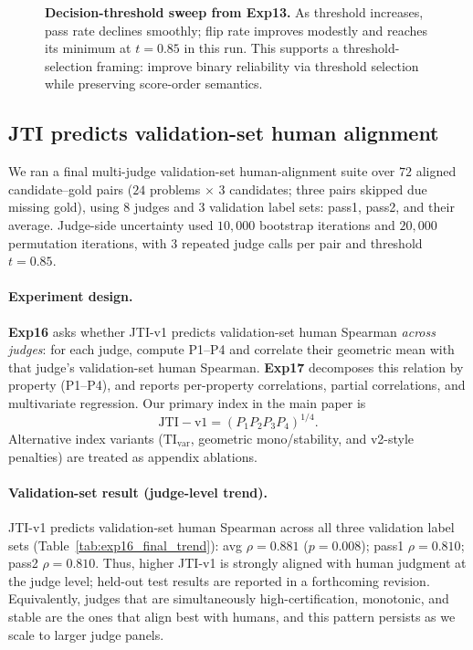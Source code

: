 \documentclass{article}
\begin{document}
\begin{figure}[t]
  \centering
  \resizebox{\linewidth}{!}{}
  \caption{\textbf{Decision-threshold sweep from Exp13.}
    As threshold increases, pass rate declines smoothly; flip rate improves modestly and reaches its minimum at \(t=0.85\) in this run.
    This supports a threshold-selection framing: improve binary reliability via threshold selection while preserving score-order semantics.}
  \label{fig:exp13_threshold_curve}
\end{figure}

\subsection{JTI predicts validation-set human alignment}\label{sec:validation-human-alignment}
We ran a final multi-judge validation-set human-alignment suite over \(72\) aligned candidate--gold pairs (\(24\) problems \(\times\) \(3\) candidates; three pairs skipped due missing gold), using \(8\) judges and \(3\) validation label sets: pass1, pass2, and their average.
Judge-side uncertainty used \(10{,}000\) bootstrap iterations and \(20{,}000\) permutation iterations, with \(3\) repeated judge calls per pair and threshold \(t=0.85\).

\paragraph{Experiment design.}
\textbf{Exp16} asks whether JTI-v1 predicts validation-set human Spearman \emph{across judges}: for each judge, compute P1--P4 and correlate their geometric mean with that judge's validation-set human Spearman.
\textbf{Exp17} decomposes this relation by property (P1--P4), and reports per-property correlations, partial correlations, and multivariate regression.
Our primary index in the main paper is
\[
\mathrm{JTI\!-\!v1}=(P_1P_2P_3P_4)^{1/4}.
\]
Alternative index variants (\(\mathrm{TI}_{\mathrm{var}}\), geometric mono/stability, and v2-style penalties) are treated as appendix ablations.

\paragraph{Validation-set result (judge-level trend).}
JTI-v1 predicts validation-set human Spearman across all three validation label sets (Table~\ref{tab:exp16_final_trend}):
avg \(\rho=0.881\) (\(p=0.008\)); pass1 \(\rho=0.810\); pass2 \(\rho=0.810\).
Thus, higher JTI-v1 is strongly aligned with human judgment at the judge level; held-out test results are reported in a forthcoming revision.
Equivalently, judges that are simultaneously high-certification, monotonic, and stable are the ones that align best with humans, and this pattern persists as we scale to larger judge panels.
\end{document}
